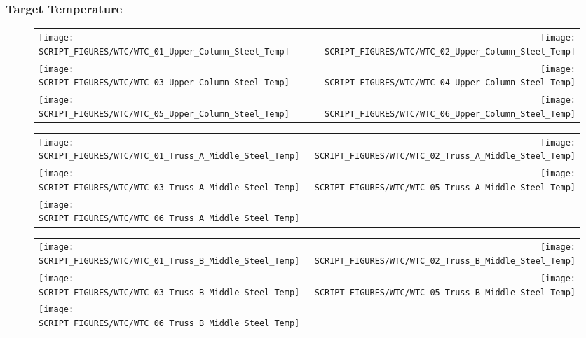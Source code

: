 \clearpage

\subsubsection{Target Temperature}

\begin{figure}[p]
\begin{tabular*}{\textwidth}{l@{\extracolsep{\fill}}r}
\texttt{[image: SCRIPT\_FIGURES/WTC/WTC\_01\_Upper\_Column\_Steel\_Temp]} &
\texttt{[image: SCRIPT\_FIGURES/WTC/WTC\_02\_Upper\_Column\_Steel\_Temp]} \\
\texttt{[image: SCRIPT\_FIGURES/WTC/WTC\_03\_Upper\_Column\_Steel\_Temp]} &
\texttt{[image: SCRIPT\_FIGURES/WTC/WTC\_04\_Upper\_Column\_Steel\_Temp]} \\
\texttt{[image: SCRIPT\_FIGURES/WTC/WTC\_05\_Upper\_Column\_Steel\_Temp]} &
\texttt{[image: SCRIPT\_FIGURES/WTC/WTC\_06\_Upper\_Column\_Steel\_Temp]}
\end{tabular*}
\end{figure}

\begin{figure}[p]
\begin{tabular*}{\textwidth}{l@{\extracolsep{\fill}}r}
\texttt{[image: SCRIPT\_FIGURES/WTC/WTC\_01\_Truss\_A\_Middle\_Steel\_Temp]} &
\texttt{[image: SCRIPT\_FIGURES/WTC/WTC\_02\_Truss\_A\_Middle\_Steel\_Temp]} \\
\texttt{[image: SCRIPT\_FIGURES/WTC/WTC\_03\_Truss\_A\_Middle\_Steel\_Temp]} &
\texttt{[image: SCRIPT\_FIGURES/WTC/WTC\_05\_Truss\_A\_Middle\_Steel\_Temp]} \\
\texttt{[image: SCRIPT\_FIGURES/WTC/WTC\_06\_Truss\_A\_Middle\_Steel\_Temp]}
\end{tabular*}
\end{figure}

\begin{figure}[p]
\begin{tabular*}{\textwidth}{l@{\extracolsep{\fill}}r}
\texttt{[image: SCRIPT\_FIGURES/WTC/WTC\_01\_Truss\_B\_Middle\_Steel\_Temp]} &
\texttt{[image: SCRIPT\_FIGURES/WTC/WTC\_02\_Truss\_B\_Middle\_Steel\_Temp]} \\
\texttt{[image: SCRIPT\_FIGURES/WTC/WTC\_03\_Truss\_B\_Middle\_Steel\_Temp]} &
\texttt{[image: SCRIPT\_FIGURES/WTC/WTC\_05\_Truss\_B\_Middle\_Steel\_Temp]} \\
\texttt{[image: SCRIPT\_FIGURES/WTC/WTC\_06\_Truss\_B\_Middle\_Steel\_Temp]}
\end{tabular*}
\end{figure}

